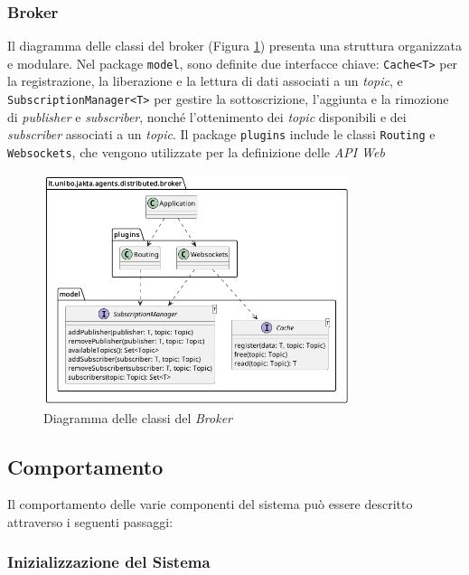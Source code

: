\subsubsection{Broker}

Il diagramma delle classi del broker (Figura \ref{fig:broker-class-diagram}) presenta una struttura organizzata e modulare. Nel package \texttt{model}, sono definite due interfacce chiave: \texttt{Cache<T>} per la registrazione, la liberazione e la lettura di dati associati a un \textit{topic}, e \texttt{SubscriptionManager<T>} per gestire la sottoscrizione, l'aggiunta e la rimozione di \textit{publisher} e \textit{subscriber}, nonché l'ottenimento dei \textit{topic} disponibili e dei \textit{subscriber} associati a un \textit{topic}. Il package \texttt{plugins} include le classi \texttt{Routing} e \texttt{Websockets}, che vengono utilizzate per la definizione delle \textit{API Web}

\begin{figure}[ht!]
    \centering
    \includegraphics[width=0.8\textwidth]{figures/broker-class-diagram.png}
    \caption{Diagramma delle classi del \textit{Broker}}
    \label{fig:broker-class-diagram}
\end{figure}

\subsection{Comportamento}
Il comportamento delle varie componenti del sistema può essere descritto attraverso i seguenti passaggi:

\subsubsection{Inizializzazione del Sistema}

